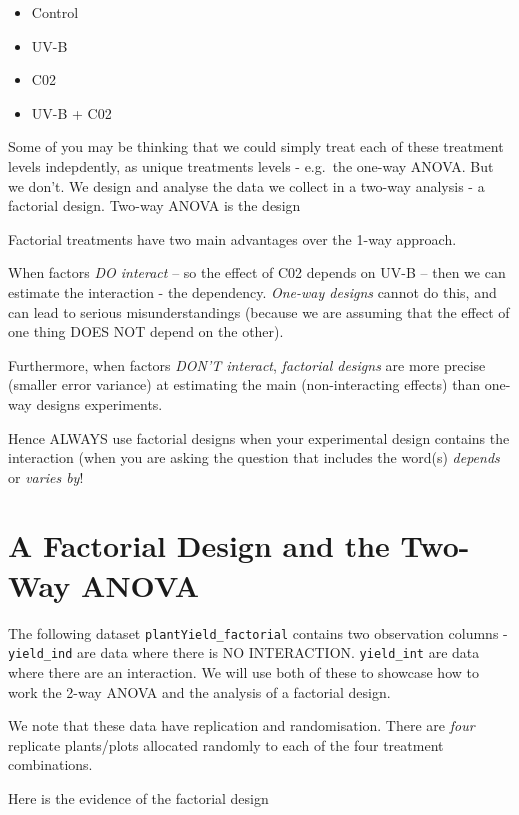 \documentclass[
]{book}
\providecommand{\tightlist}{%
  \setlength{\itemsep}{0pt}\setlength{\parskip}{0pt}}
\begin{document}
\begin{itemize}
\tightlist
\item
  Control
\item
  UV-B
\item
  C02
\item
  UV-B + C02
\end{itemize}

Some of you may be thinking that we could simply treat each of these treatment levels indepdently, as unique treatments levels - e.g.~the one-way ANOVA. But we don't. We design and analyse the data we collect in a two-way analysis - a factorial design. Two-way ANOVA is the design

Factorial treatments have two main advantages over the 1-way approach.

When factors \emph{DO interact} -- so the effect of C02 depends on UV-B -- then we can estimate the interaction - the dependency. \emph{One-way designs} cannot do this, and can lead to serious misunderstandings (because we are assuming that the effect of one thing DOES NOT depend on the other).

Furthermore, when factors \emph{DON'T interact}, \emph{factorial designs} are more precise (smaller error variance) at estimating the main (non-interacting effects) than one-way designs experiments.

Hence ALWAYS use factorial designs when your experimental design contains the interaction (when you are asking the question that includes the word(s) \emph{depends} or \emph{varies by}!

\hypertarget{a-factorial-design-and-the-two-way-anova}{%
\section{A Factorial Design and the Two-Way ANOVA}\label{a-factorial-design-and-the-two-way-anova}}

The following dataset \texttt{plantYield\_factorial} contains two observation columns - \texttt{yield\_ind} are data where there is NO INTERACTION. \texttt{yield\_int} are data where there are an interaction. We will use both of these to showcase how to work the 2-way ANOVA and the analysis of a factorial design.

We note that these data have replication and randomisation. There are \emph{four} replicate plants/plots allocated randomly to each of the four treatment combinations.

Here is the evidence of the factorial design
\end{document}
